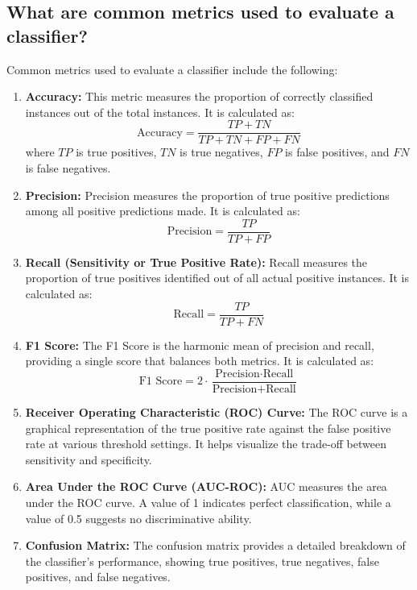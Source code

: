 \subsection{What are common metrics used to evaluate a classifier?}

Common metrics used to evaluate a classifier include the following:

\begin{enumerate}
    \item \textbf{Accuracy:} 
    This metric measures the proportion of correctly classified instances out of the total instances. It is calculated as:
    \[
    \text{Accuracy} = \frac{TP + TN}{TP + TN + FP + FN}
    \]
    where \(TP\) is true positives, \(TN\) is true negatives, \(FP\) is false positives, and \(FN\) is false negatives.

    \item \textbf{Precision:} 
    Precision measures the proportion of true positive predictions among all positive predictions made. It is calculated as:
    \[
    \text{Precision} = \frac{TP}{TP + FP}
    \]

    \item \textbf{Recall (Sensitivity or True Positive Rate):} 
    Recall measures the proportion of true positives identified out of all actual positive instances. It is calculated as:
    \[
    \text{Recall} = \frac{TP}{TP + FN}
    \]

    \item \textbf{F1 Score:} 
    The F1 Score is the harmonic mean of precision and recall, providing a single score that balances both metrics. It is calculated as:
    \[
    \text{F1 Score} = 2 \cdot \frac{\text{Precision} \cdot \text{Recall}}{\text{Precision} + \text{Recall}}
    \]

    \item \textbf{Receiver Operating Characteristic (ROC) Curve:} 
    The ROC curve is a graphical representation of the true positive rate against the false positive rate at various threshold settings. It helps visualize the trade-off between sensitivity and specificity.

    \item \textbf{Area Under the ROC Curve (AUC-ROC):} 
    AUC measures the area under the ROC curve. A value of 1 indicates perfect classification, while a value of 0.5 suggests no discriminative ability.

    \item \textbf{Confusion Matrix:} 
    The confusion matrix provides a detailed breakdown of the classifier's performance, showing true positives, true negatives, false positives, and false negatives.


\end{enumerate}
